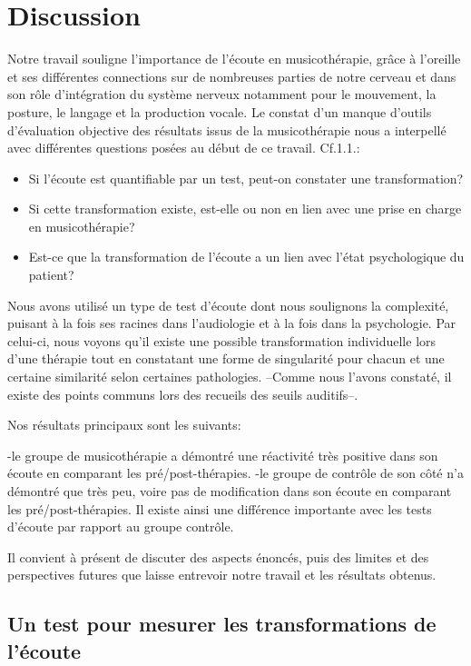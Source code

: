 \chapter{Discussion}
Notre travail souligne l'importance de l'écoute en
musicothérapie, grâce à
l'oreille et ses différentes connections sur de nombreuses parties de
notre cerveau et dans son rôle d'intégration du système
nerveux notamment pour le mouvement, la posture, le langage et la
production vocale.
Le constat d'un manque d'outils d'évaluation
objective des résultats issus de la musicothérapie nous a interpellé
avec différentes questions posées au début de ce travail. Cf.1.1.:

\begin{itemize}
     \item Si l'écoute est quantifiable  par un test, peut-on constater une
transformation?
\item Si cette transformation existe, est-elle ou non en lien avec
une prise en charge en musicothérapie?
\item Est-ce que la transformation de l'écoute a un lien avec l'état
psychologique du patient?
\end{itemize}
Nous avons utilisé un type de test d'écoute dont nous soulignons la complexité, puisant
à la fois ses racines dans l'audiologie et à la fois dans la psychologie. 
Par celui-ci, nous voyons  
qu'il  existe une possible transformation
individuelle lors d'une
thérapie tout 
 en constatant une forme de singularité pour chacun et une
certaine similarité selon certaines pathologies. --Comme nous l'avons
constaté, il existe des points communs lors des recueils des seuils
auditifs--.

Nos résultats
principaux sont les suivants:

-le groupe de musicothérapie a démontré une réactivité très positive
dans son écoute en comparant les pré/post-thérapies. 
-le groupe de contrôle de son côté n'a démontré que très peu, voire pas de
modification dans son écoute en comparant les pré/post-thérapies. 
Il existe ainsi une différence importante avec les tests d'écoute par rapport au
groupe contrôle.

Il convient à présent de discuter des aspects énoncés, puis des
limites et des perspectives futures que laisse entrevoir notre travail
et les résultats obtenus.
 
\section{Un test pour mesurer les trans\-for\-ma\-tions de l'écoute}

